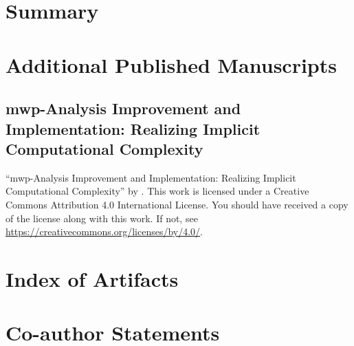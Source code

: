 \chapter{Summary}\label{ch:summary}


\backmatter
\printbibliography[label=chap:references, title=References]
\let\printbibliography\relax

\appendix

\chapter{Additional Published Manuscripts}\label{additional-manuscripts}

    \section{mwp-Analysis Improvement and Implementation: Realizing Implicit
    Computational Complexity}\label{sec:fscd}
    \pageIconAnalysis
    {\par\enquote{mwp-Analysis Improvement and Implementation: Realizing Implicit Computational Complexity}
    \textcopyright{ }by{ }\CTNT.
    \newline{}This work is licensed under a Creative Commons Attribution 4.0 International License.
    \newline{}You should have received a copy of the license along with this work.
    \newline{}If not, see \url{https://creativecommons.org/licenses/by/4.0/}.}
    
    \clearpage

\chapter{Index of Artifacts}\label{app:sec:artifacts}

\clearpage

\chapter{Co-author Statements}\label{app:sec:coauth}

\clearpage

\pagestyle{plain}
\printglossary[type=\acronymtype,nonumberlist,title={Index of Acronyms},style=longragged]
\clearpage

\pagestyle{plain}
\printglossary[type=symbols]
\clearpage

\printindex